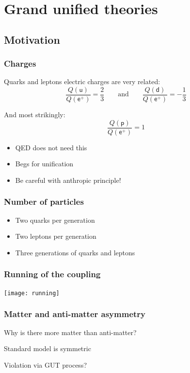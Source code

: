 \documentclass[english, fleqn]{beamer}
\newcommand\qqandqq{\qquad\text{and}\qquad}
\begin{document}
\section{Grand unified theories}

\subsection{Motivation}

\begin{frame}
    \frametitle{Charges}

    Quarks and leptons electric charges are very related:
    \[
        \frac{Q(\mathsf u)}{Q(\mathsf e^+)} = \frac 23
        \qqandqq
        \frac{Q(\mathsf d)}{Q(\mathsf e^+)} = - \frac 13
    \]

    \pause

    And most strikingly:
    \[
        \frac{Q(\mathsf p)}{Q(\mathsf e^+)} = 1
    \]

    \pause

    \begin{itemize}
        \item QED does not need this
        \item Begs for unification
        \item Be careful with anthropic principle!
    \end{itemize}
\end{frame}

\begin{frame}
    \frametitle{Number of particles}

    \begin{itemize}
        \item Two quarks per generation
        \item Two leptons per generation
        \item Three generations of quarks and leptons
    \end{itemize}
\end{frame}

\begin{frame}
    \frametitle{Running of the coupling}

    {
        \centering
        \texttt{[image: running]}
    }

    \parencite{Peskin/1997ez}
\end{frame}

\begin{frame}

    \frametitle{Matter and anti-matter asymmetry}

    Why is there more matter than anti-matter?

    Standard model is symmetric

    Violation via GUT process?
\end{frame}
\end{document}

